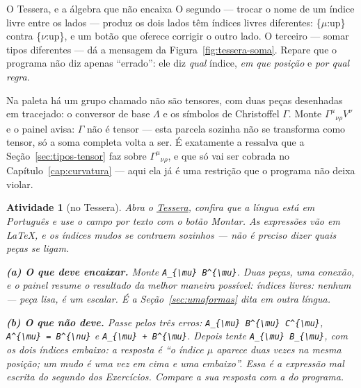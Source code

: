 \documentclass[12pt,a4paper,oneside]{book}
\theoremstyle{rgplain}
\newtheorem{activity}{Atividade}[chapter]
\theoremstyle{rgremark}
\begin{document}
\begin{interludio}{O Tessera, e a álgebra que não encaixa}
O segundo --- trocar o nome de um índice livre entre os lados --- produz
\textsf{os dois lados têm índices livres diferentes: \{$\mu$:up\} contra
\{$\nu$:up\}}, e um botão que oferece corrigir o outro lado. O terceiro ---
somar tipos diferentes --- dá a mensagem da Figura~\ref{fig:tessera-soma}.
Repare que o programa não diz apenas ``errado'': ele diz \emph{qual} índice,
\emph{em que posição} e \emph{por qual regra}.

\begin{atencao}[title={\sffamily\bfseries\footnotesize\color{rgTerracota}O QUE A APOSTILA AFIRMA, O PROGRAMA IMPÕE}]
Na paleta há um grupo chamado \textsf{não são tensores}, com duas peças
desenhadas em tracejado: o conversor de base $\Lambda$ e os símbolos de
Christoffel $\Gamma$. Monte $\Gamma^\mu{}_{\nu\rho}V^\nu$ e o painel avisa:
\textsf{$\Gamma$ não é tensor --- esta parcela sozinha não se transforma como
tensor, só a soma completa volta a ser}. É exatamente a ressalva que a
Seção~\ref{sec:tipos-tensor} faz sobre $\Gamma^\mu{}_{\nu\rho}$, e que só vai
ser cobrada no Capítulo~\ref{cap:curvatura} --- aqui ela já é uma restrição que
o programa não deixa violar.
\end{atencao}

\begin{activity}[no Tessera]
\label{atv:tessera}
Abra o \href{\rgsitetessera}{Tessera}, confira que a língua está em
\textsf{Português} e use o campo \textsf{por texto} com o botão
\textsf{Montar}. As expressões vão em \LaTeX{}, e os índices mudos se contraem
sozinhos --- não é preciso dizer quais peças se ligam.

\textbf{(a) O que deve encaixar.} Monte \texttt{A\_\{\textbackslash mu\}
B\^{}\{\textbackslash mu\}}. Duas peças, uma conexão, e o painel resume o
resultado da melhor maneira possível: \textsf{índices livres: nenhum --- peça
lisa, é um escalar}. É a Seção~\ref{sec:umaformas} dita em outra língua.

\textbf{(b) O que não deve.} Passe pelos três erros:
\texttt{A\_\{\textbackslash mu\} B\^{}\{\textbackslash mu\}
C\^{}\{\textbackslash mu\}},
\texttt{A\^{}\{\textbackslash mu\} = B\^{}\{\textbackslash nu\}} e
\texttt{A\_\{\textbackslash mu\} + B\^{}\{\textbackslash mu\}}. Depois tente
\texttt{A\_\{\textbackslash mu\} B\_\{\textbackslash mu\}}, com os dois índices
embaixo: a resposta é ``o índice $\mu$ aparece duas vezes na mesma posição; um
mudo é uma vez em cima e uma embaixo''. Essa é a expressão mal escrita do segundo dos Exercícios. Compare a sua resposta com a do programa.


\end{activity}
\end{interludio}
\end{document}
